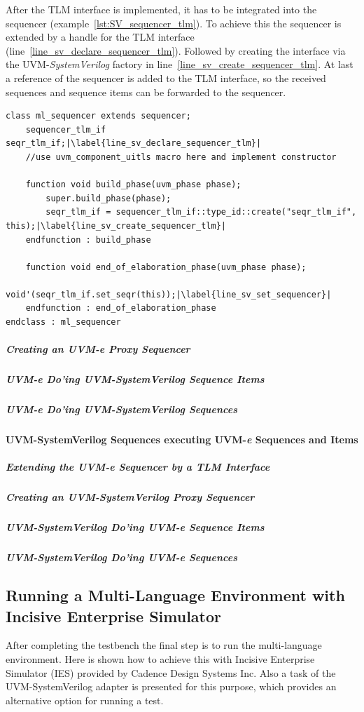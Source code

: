 After the TLM interface is implemented, it has to be integrated into the sequencer (example~\ref{lst:SV_sequencer_tlm}). To achieve this the sequencer is extended by a handle for the TLM interface (line~\ref{line_sv_declare_sequencer_tlm}). Followed by creating the interface via the UVM-\emph{SystemVerilog} factory in line~\ref{line_sv_create_sequencer_tlm}. At last a reference of the sequencer is added to the TLM interface, so the received sequences and sequence items can be forwarded to the sequencer. 
\lstset{language=SystemVerilog, numbers = left, escapechar=|, breaklines=true}
\begin{lstlisting}[frame=htrbl, caption={SystemVerilog: extending the sequencer by a TLM interface},
label={lst:SV_sequencer_tlm}]
class ml_sequencer extends sequencer;
    sequencer_tlm_if seqr_tlm_if;|\label{line_sv_declare_sequencer_tlm}|
    //use uvm_component_uitls macro here and implement constructor

    function void build_phase(uvm_phase phase);
        super.build_phase(phase);
        seqr_tlm_if = sequencer_tlm_if::type_id::create("seqr_tlm_if", this);|\label{line_sv_create_sequencer_tlm}|
    endfunction : build_phase

    function void end_of_elaboration_phase(uvm_phase phase);
        void'(seqr_tlm_if.set_seqr(this));|\label{line_sv_set_sequencer}|
    endfunction : end_of_elaboration_phase
endclass : ml_sequencer
\end{lstlisting}
\subparagraph{Creating an UVM-\textit{e} Proxy Sequencer}

\subparagraph{UVM-\textit{e} Do'ing UVM-SystemVerilog Sequence Items}
\subparagraph{UVM-\textit{e} Do'ing UVM-SystemVerilog Sequences}
\paragraph{UVM-SystemVerilog Sequences executing UVM-\textit{e} Sequences and Items}
\subparagraph{Extending the UVM-\textit{e} Sequencer by a TLM Interface}
\subparagraph{Creating an UVM-SystemVerilog Proxy Sequencer}
\subparagraph{UVM-SystemVerilog Do'ing UVM-\textit{e} Sequence Items}
\subparagraph{UVM-SystemVerilog Do'ing UVM-\textit{e} Sequences}
\subsection{Running a Multi-Language Environment with Incisive Enterprise Simulator}

After completing the testbench the final step is to run the multi-language environment. Here is shown how to achieve
this with Incisive Enterprise Simulator (IES) provided by Cadence Design Systems Inc. Also a task of the
UVM-SystemVerilog adapter is presented for this purpose, which provides an alternative option for running a test.

